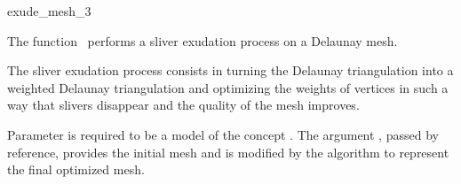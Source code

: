 \ccRefPageBegin


\begin{ccRefFunction}{exude_mesh_3}  %


\ccDefinition
  
The function \ccRefName\ performs a sliver exudation  process on a  Delaunay mesh.

The sliver exudation process consists in turning the Delaunay triangulation
into a weighted Delaunay triangulation and  optimizing the weights
of vertices in such a way that  slivers disappear and
the  quality of the mesh improves.




\ccParameters

Parameter  is required to be a model of the concept
.
The argument , passed by
reference, provides the initial mesh  
and is modified  by the algorithm 
to represent the final optimized mesh.


\end{ccRefFunction}

